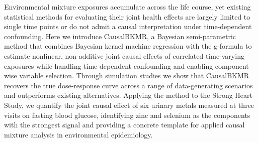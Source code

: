 
Environmental mixture exposures accumulate across the life course, yet existing statistical methods for evaluating their joint health effects are largely limited to single time points or do not admit a causal interpretation under time-dependent confounding. Here we introduce CausalBKMR, a Bayesian semi-parametric method that combines Bayesian kernel machine regression with the g-formula to estimate nonlinear, non-additive joint causal effects of correlated time-varying exposures while handling time-dependent confounding and enabling component-wise variable selection. Through simulation studies we show that CausalBKMR recovers the true dose-response curve across a range of data-generating scenarios and outperforms existing alternatives. Applying the method to the Strong Heart Study, we quantify the joint causal effect of six urinary metals measured at three visits on fasting blood glucose, identifying zinc and selenium as the components with the strongest signal and providing a concrete template for applied causal mixture analysis in environmental epidemiology.
